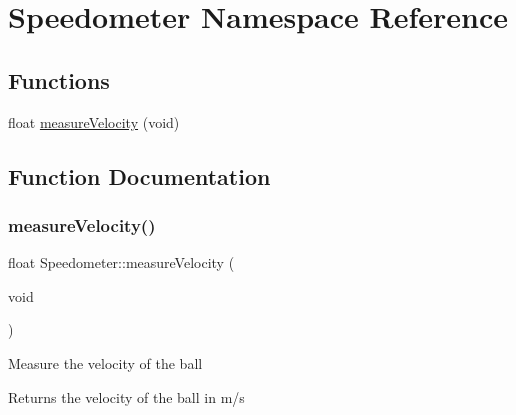 \hypertarget{namespace_speedometer}{}\section{Speedometer Namespace Reference}
\label{namespace_speedometer}
\subsection*{Functions}
\begin{DoxyCompactItemize}
\item 
float \mbox{\hyperlink{namespace_speedometer_a3a4fedefb0a44e1200dd042ab8c22721}{measure\+Velocity}} (void)
\end{DoxyCompactItemize}


\subsection{Function Documentation}
\mbox{\label{namespace_speedometer_a3a4fedefb0a44e1200dd042ab8c22721}} 
\subsubsection{\texorpdfstring{measureVelocity()}{measureVelocity()}}
{\footnotesize\ttfamily float Speedometer\+::measure\+Velocity (\begin{DoxyParamCaption}\item[{void}]{ }\end{DoxyParamCaption})}

Measure the velocity of the ball

\begin{DoxyReturn}{Returns}
the velocity of the ball in m/s 
\end{DoxyReturn}
